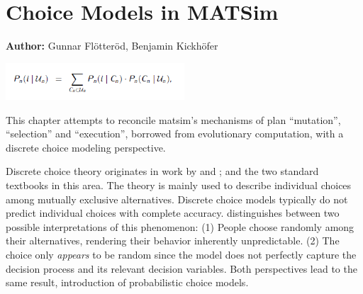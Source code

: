 \chapter{Choice Models in MATSim}
\label{ch:discretechoice}

\hfill \textbf{Author:} Gunnar Flötteröd, Benjamin Kickhöfer


\begin{center} \includegraphics[width=0.5\textwidth, angle=0]{understanding/figures/dc.png} \end{center}

This chapter attempts to reconcile \gls{matsim}'s mechanisms of plan
{}``mutation'', {}``selection'' and {}``execution'', borrowed from evolutionary computation, with a 
discrete choice modeling perspective. 

Discrete choice theory originates in work by \citet{Luce1965PreferenceUtility} and 
\citet{McFadden1975DiscreteChoiceModel}; \citet{BenAkivaLerman_1985} 
and \citet{Train_2003}  the two standard textbooks in this
area.
The theory is mainly used to describe individual choices among 
mutually exclusive %
alternatives. 
Discrete choice models typically do not predict individual choices with complete accuracy.
\citet{Luce1965PreferenceUtility} distinguishes between two possible interpretations of this phenomenon:
(1) People choose randomly among their alternatives, rendering their behavior inherently unpredictable.
(2) The choice only \emph{appears} to be random\corr{,}{} since the model does not
perfectly capture the decision process and its relevant decision variables.
Both perspectives lead to the same result,  %
introduction of probabilistic choice models.

